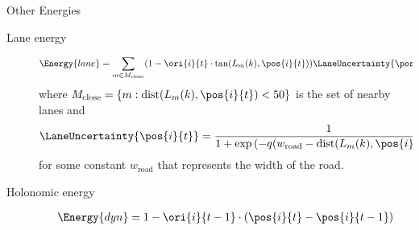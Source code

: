 \documentclass[final]{beamer}
\newlength{\onecolwid}
\begin{document}
\begin{frame}[t]
\begin{columns}[t]
\begin{column}{\onecolwid}



      \begin{block}{Other Energies}
        \begin{description}
          \item[Lane energy]
            \begin{multline}
              \label{eq:laneOrientationEnergy}
              \Energy{lane} = 
              \sum_{m \in M_{\text{close}}}
              (1 - \ori{i}{t} \cdot \text{tan}(L_{m}(k), \pos{i}{t}) )
              \LaneUncertainty{\pos{i}{t}}
            \end{multline}
            where $M_{\text{close}} = \{m : \text{dist}(L_{m}(k), \pos{i}{t}) < 50\} $ is
            the set of nearby lanes and 
            \begin{multline}
              \LaneUncertainty{\pos{i}{t}} = 
              \frac{1}{1 + \exp{(-q(w_{\text{road}} - \text{dist}(L_{m}(k), \pos{i}{t})))}}
            \end{multline}
            for some constant $w_{\text{road}}$ that represents the width of the road.

          \item[Holonomic energy]
            \begin{align}
              \label{eq:totalPosTransitionEnergy}
              \Energy{dyn} = 1 - \ori{i}{t-1} \cdot (\pos{i}{t} - \pos{i}{t-1})
            \end{align}





\end{description}
\end{block}
\end{column}
\end{columns}
\end{frame}
\end{document}
